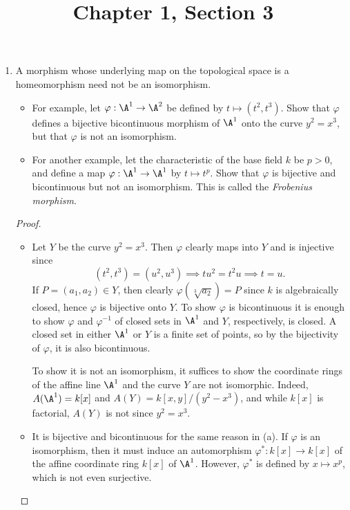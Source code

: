 \documentclass[a4paper]{article}
\title{Chapter 1, Section 3}
\begin{document}
\maketitle
\begin{enumerate} [label=\textbf{\arabic*.}, leftmargin=-0.05em]

\item[\textbf{2.}] A morphism whose underlying map on the topological space is a homeomorphism need not be an isomorphism.
\begin{itemize}
    \item[(a)] For example, let $\varphi : \A^1 \to \A^2$ be defined by $t \mapsto (t^2, t^3)$. Show that $\varphi$ defines a bijective bicontinuous morphism of $\A^1$ onto the curve $y^2 = x^3$, but that $\varphi$ is not an isomorphism.

    \item[(b)] For another example, let the characteristic of the base field $k$ be $p > 0$, and define a map $\varphi : \A^1 \to \A^1$ by $t \mapsto t^p$. Show that $\varphi$ is bijective and bicontinuous but not an isomorphism. This is called the \textit{Frobenius morphism}.
\end{itemize}

\begin{proof} $ $ \vspace{0pt}
   \begin{itemize} [leftmargin=0cm]
    \item[(a)] Let $Y$ be the curve $y^2 = x^3$. Then $\varphi$ clearly maps into $Y$ and is injective since
    \begin{equation*}
        (t^2, t^3) = (u^2, u^3) \implies tu^2 = t^2u \implies t = u.
    \end{equation*}
    If $P = (a_1, a_2) \in Y$, then clearly $\varphi(\sqrt[3]{a_2}) = P$ since $k$ is algebraically closed, hence $\varphi$ is bijective onto $Y$. To show $\varphi$ is bicontinuous it is enough to show $\varphi$ and $\varphi^{-1}$ of closed sets in $\A^1$ and $Y$, respectively, is closed. A closed set in either $\A^1$ or $Y$ is a finite set of points, so by the bijectivity of $\varphi$, it is also bicontinuous.

    To show it is not an isomorphism, it suffices to show the coordinate rings of the affine line $\A^1$ and the curve $Y$ are not isomorphic. Indeed, $A(\A^1) = k[x]$ and $A(Y) = k[x, y] / (y^2 - x^3)$, and while $k[x]$ is factorial, $A(Y)$ is not since $y^2 = x^3$.

    \item[(b)] It is bijective and bicontinuous for the same reason in (a). If $\varphi$ is an isomorphism, then it must induce an automorphism $\varphi^* : k[x] \to k[x]$ of the affine coordinate ring $k[x]$ of $\A^1$. However, $\varphi^*$ is defined by $x \mapsto x^p$, which is not even surjective.
   \end{itemize} 
\end{proof}


\end{enumerate}
\end{document}
